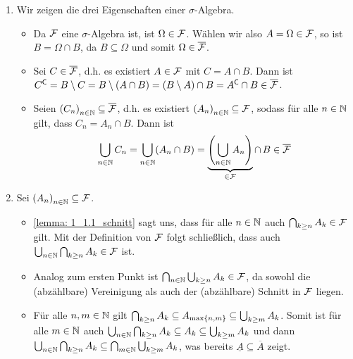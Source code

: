 \begin{exercisePage}
    \begin{enumerate}[leftmargin=*, label=(\alph*)]
        \item Wir zeigen die drei Eigenschaften einer $\sigma$-Algebra.
            \begin{itemize}[leftmargin=*]
                \item Da $\mathcal{F}$ eine $\sigma$-Algebra ist, ist $\Omega \in \mathcal{F}$. Wählen wir also $A = \Omega \in \mathcal{F}$, so ist $B = \Omega \cap B$, da $B \subseteq \Omega$ und somit $\Omega \in \overline{\mathcal{F}}$.
                \item Sei $C \in \overline{\mathcal{F}}$, d.h. es existiert $A \in \mathcal{F}$ mit $C = A \cap B$. Dann ist $C^{\mathsf{C}} = B \setminus C = B \setminus (A \cap B) = (B \setminus A) \cap B = A^{\mathsf{C}} \cap B \in \overline{\mathcal{F}}$.
                \item Seien $\folge{C_n} \subseteq \quer{\ereignisF}$, d.h. es existiert $\folge{A_n} \subseteq \ereignisF$, sodass für alle $n \in \mathbb{N}$ gilt, dass $C_n = A_n \cap B$. Dann ist
                \begin{equation*}
                    \bigcup_{n \in \mathbb{N}} C_n = \bigcup_{n \in \mathbb{N}} (A_n \cap B) =  \underbrace{ \left( \bigcup_{n \in \mathbb{N}} A_n \right)}_{\in \mathcal{F}}  \cap \, B \in \overline{\mathcal{F}}
                \end{equation*}
            \end{itemize}
        \item Sei $\folge{A_n} \subseteq \ereignisF$. 
            \begin{itemize}[leftmargin=*]
                \item \cref{lemma: 1_1.1_schnitt} sagt uns, dass für alle $n \in \mathbb{N}$ auch $\bigcap_{k \geq n} A_k \in \mathcal{F}$ gilt. Mit der Definition von $\mathcal{F}$ folgt schließlich, dass auch $\bigcup_{n \in \mathbb{N}} \bigcap_{k \geq n} A_k \in \mathcal{F}$ ist.
                \item Analog zum ersten Punkt ist $\bigcap_{n \in \mathbb{N}} \bigcup_{k \geq n} A_k \in \mathcal{F}$, da sowohl die (abzählbare) Vereinigung als auch der (abzählbare) Schnitt in $\mathcal{F}$ liegen.
                \item Für alle $n,m \in \mathbb{N}$ gilt $\bigcap_{k \geq n} A_k \subseteq A_{\max \left\{ n,m \right\}} \subseteq \bigcup_{k \geq m} A_k$. Somit ist für alle $m \in \mathbb{N}$ auch $\bigcup_{n \in \mathbb{N}} \bigcap_{k \geq n} A_k \subseteq A_k \subseteq \bigcup_{k \geq m} A_k$ und dann $\bigcup_{n \in \mathbb{N}} \bigcap_{k \geq n} A_k \subseteq \bigcap_{m \in \mathbb{N}} \bigcup_{k \geq m} A_k$, was bereits $\underline{A} \subseteq \overline{A}$ zeigt.
            \end{itemize}
    \end{enumerate}


\end{exercisePage}
